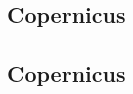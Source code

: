 \documentclass[10pt]{beamer}
\begin{document}
\begin{frame}
  
\end{frame}


\subsection{Copernicus}


\begin{frame}
  
\end{frame}


\subsection{Copernicus}


\begin{frame}
  
\end{frame}
\end{document}
